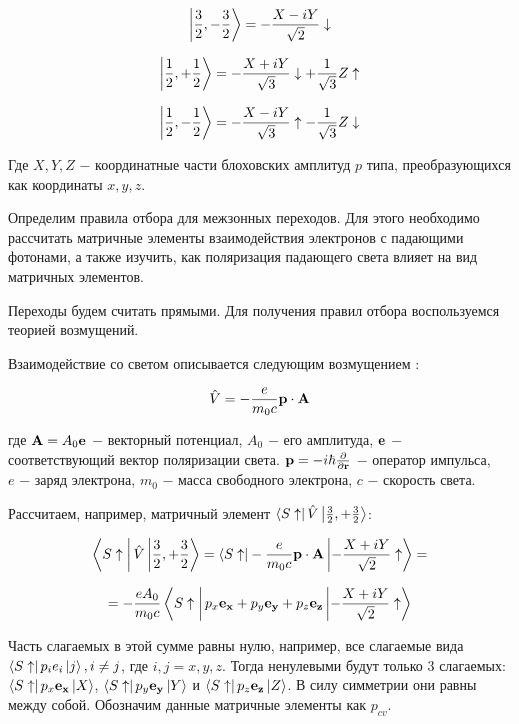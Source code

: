 \documentclass[14pt]{extarticle}
\numberwithin{equation}{section}
\begin{document}
\begin{equation}
\ket{\frac{3}{2}, -\frac{3}{2}} = - \frac{X - iY}{\sqrt{2}}\downarrow  
\end{equation}

\begin{equation}
\ket{\frac{1}{2}, +\frac{1}{2}} = - \frac{X + iY}{\sqrt{3}}\downarrow + \frac{1}{\sqrt{3}}Z \uparrow 
\end{equation}

\begin{equation}
\ket{\frac{1}{2}, -\frac{1}{2}} = - \frac{X - iY}{\sqrt{3}}\uparrow - \frac{1}{\sqrt{3}}Z \downarrow 
\end{equation}

Где $X, Y, Z $ $-$ координатные части блоховских амплитуд $p$ типа, преобразующихся как координаты $x, y,z$.

Определим правила отбора для межзонных переходов. Для этого необходимо рассчитать матричные элементы взаимодействия электронов с падающими фотонами, а также изучить, как поляризация падающего света влияет на вид матричных элементов.

Переходы будем считать прямыми. Для получения правил отбора воспользуемся теорией возмущений.

Взаимодействие со светом описывается следующим возмущением  \cite{anselm1978}:

\begin{equation}
	\hat{V} = -\frac{e}{m_0c} {\bf p} \cdot {\bf A}
\end{equation}

где ${\bf A} = A_0{\bf e}$ $-$ векторный потенциал, $A_0 $ $-$ его амплитуда,  ${\bf e}$ $-$ соответствующий вектор поляризации света. ${\bf p} = -i \hbar \frac{\partial}{\partial{\bf r}}$ $-$ оператор импульса, \\$e$ $-$ заряд электрона, $m_0$ $-$ масса свободного электрона, $c$ $-$ скорость света.

 Рассчитаем, например, матричный элемент $\bra{S \uparrow }\hat{V}\ket{\frac{3}{2}, +\frac{3}{2}}$:

\[\bra{S \uparrow \vphantom{\frac{3}{2}} }\hat{V}\ket{\frac{3}{2}, +\frac{3}{2}} = \bra{S \uparrow } -\frac{e}{m_0c} {\bf p} \cdot {\bf A} \ket{-\frac{X + iY}{\sqrt{2}}\uparrow } = \]

\[   = - \frac{e A_0}{m_0c}\bra{S \uparrow  \vphantom{\frac{3}{2}}} p_x{\bf e_x} + p_y{\bf e_y} + p_z{\bf e_z}\ket{-\frac{X + iY}{\sqrt{2}}\uparrow } \]

Часть слагаемых в этой сумме равны нулю, например, все слагаемые вида $\bra{S \uparrow}p_ie_i\ket{j}, i \neq j$, где $i,j = x, y,z$.
Тогда ненулевыми будут только 3 слагаемых: $\bra{S \uparrow}p_x{\bf e_x}\ket{X}$, $\bra{S \uparrow}p_y{\bf e_y}\ket{Y}$ и $\bra{S \uparrow}p_z{\bf e_z}\ket{Z}$. В силу симметрии они равны между собой. Обозначим данные матричные элементы как $p_{cv}$.
\end{document}
